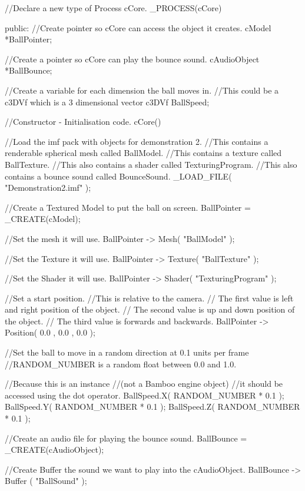 \begin{DoxyCode}
 //Declare a new type of Process cCore.
 _PROCESS(cCore)
 {
 public:
 //Create pointer so cCore can  access the object it creates.
 cModel *BallPointer;

 //Create a pointer so cCore can play the bounce sound.
 cAudioObject *BallBounce;

 //Create a variable for each dimension the ball moves in.
 //This could be a c3DVf which is a 3 dimensional vector
 c3DVf BallSpeed;

  //Constructor - Initialisation code.
        cCore()
        {
        //Load the imf pack with objects for demonstration 2.
        //This contains a renderable spherical mesh called BallModel.
        //This contains a texture called BallTexture.
        //This also contains a shader called TexturingProgram.
        //This also contains a bounce sound called BounceSound.
                 _LOAD_FILE( "Demonstration2.imf" );

        //Create a Textured Model to put the ball on screen.
                BallPointer =  _CREATE(cModel);

        //Set the mesh it will use.
                BallPointer -> Mesh( "BallModel" );

        //Set the Texture it will use.
                BallPointer -> Texture( "BallTexture" );

        //Set the Shader it will use.
                BallPointer -> Shader( "TexturingProgram" );

        //Set a start position.
        //This is relative to the camera.
        // The first value is left and right position of the object.
        // The second value is up and down position of the object.
        // The third value is forwards and backwards.
                BallPointer -> Position( 0.0 , 0.0 , 0.0 );

        //Set the ball to move in a random direction at 0.1 units per frame
        //RANDOM_NUMBER is a random float between 0.0 and 1.0.

        //Because this is an instance
    //(not a Bamboo engine object)
    //it should be accessed using the dot operator.
                BallSpeed.X( RANDOM_NUMBER * 0.1 );
                BallSpeed.Y( RANDOM_NUMBER * 0.1 );
                BallSpeed.Z( RANDOM_NUMBER * 0.1 );

        //Create an audio file for playing the bounce sound.
                BallBounce = _CREATE(cAudioObject);

        //Create Buffer the sound we want to play into the cAudioObject.
                BallBounce -> Buffer ( "BallSound" );

}}
\end{DoxyCode}
